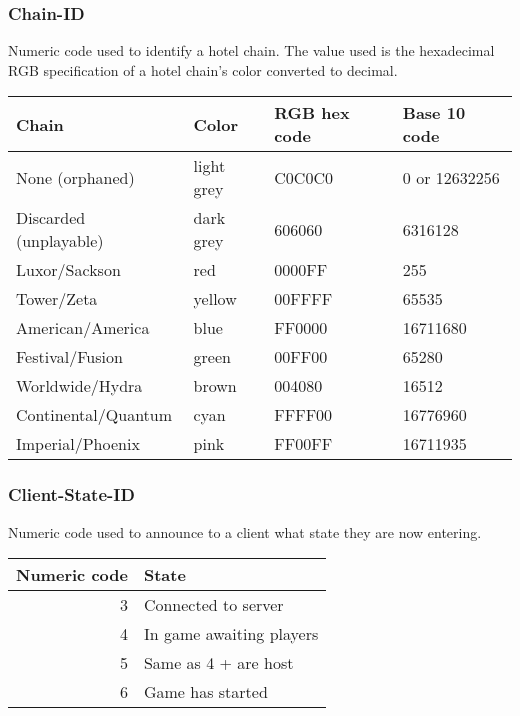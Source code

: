 \documentclass{article}
\begin{document}
\subsubsection{Chain-ID} %
\label{ssub:chain_id}

Numeric code used to identify a hotel chain. The value used is the hexadecimal RGB specification of a hotel chain's color converted to decimal.

\begin{tabular}{l|l|l|l}
  Chain	                 & Color      & RGB hex code	& Base 10 code  \\
  \hline
  None (orphaned)	       & light grey & C0C0C0        &	0 or 12632256 \\
  Discarded (unplayable) & dark grey  & 606060        &	6316128       \\
  \hline
  Luxor/Sackson          & red        & 0000FF        & 255           \\
  Tower/Zeta             & yellow     & 00FFFF        & 65535         \\
  American/America       & blue       & FF0000        & 16711680      \\
  Festival/Fusion        & green      & 00FF00        & 65280         \\
  Worldwide/Hydra        & brown      & 004080        & 16512         \\
  Continental/Quantum    & cyan       & FFFF00        & 16776960      \\
  Imperial/Phoenix       & pink       & FF00FF        & 16711935
\end{tabular}


\subsubsection{Client-State-ID} %
\label{ssub:client_state_id}

Numeric code used to announce to a client what state they are now entering.

\begin{tabular}{r|l}
  Numeric code & State                     \\
  \hline
             3 & Connected to server       \\
             4 & In game awaiting players  \\
             5 & Same as 4 + are host      \\
             6 & Game has started
\end{tabular}
\end{document}
